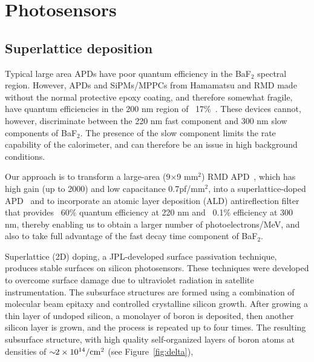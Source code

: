 \section{Photosensors}

\subsection{Superlattice deposition}

Typical large area APDs have poor quantum efficiency in the BaF$_2$ spectral region.  However, APDs and SiPMs/MPPCs from Hamamatsu and RMD made without the normal protective epoxy coating, and therefore somewhat fragile,  have quantum efficiencies in the 200 nm region of ~17\%~\cite{sato:2013}. These devices cannot, however, discriminate between the 220 nm fast component and 300 nm slow components of BaF$_2$. The presence of the slow component limits the rate capability of the calorimeter, and can therefore be an issue in high background conditions.

Our approach is to transform a large-area (9$\times$9 mm$^2$) RMD APD~\cite{RMD}, which has high gain (up to 2000) and low capacitance 0.7pf/mm$^2$, into a superlattice-doped APD~\cite{hoenk:2013} and to incorporate an atomic layer deposition (ALD) antireflection filter~\cite{hennessy:2015} that provides ~60\% quantum efficiency at 220 nm and ~0.1\% efficiency at 300 nm, thereby enabling us to obtain a larger number of photoelectrons/MeV, and also to take full advantage of the fast decay time component of BaF$_2$.

Superlattice (2D) doping, a JPL-developed surface passivation technique, produces stable surfaces on silicon photosensors. These techniques were developed to overcome surface damage due to ultraviolet radiation in satellite instrumentation. The subsurface structures are formed using a combination of molecular beam epitaxy and controlled crystalline silicon growth. After growing a thin layer of undoped silicon, a monolayer of boron is deposited, then another silicon layer is grown, and the process is repeated up to four times. The resulting subsurface structure, with high quality self-organized layers of boron atoms at densities of $\sim\!\! 2\times 10^{14}/{\rm cm}^2$ (see Figure~\ref{fig:delta}),

